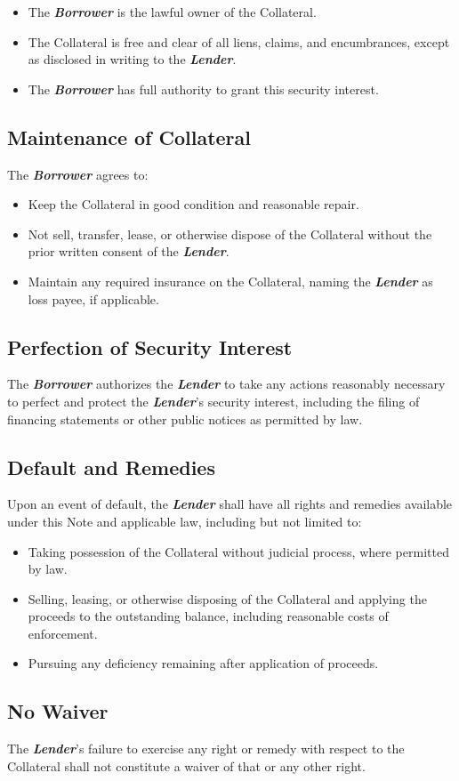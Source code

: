 \begin{itemize}
  \item The \textbf{\textit{Borrower}} is the lawful owner of the Collateral.
  \item The Collateral is free and clear of all liens, claims, and encumbrances, except as disclosed in writing to the \textbf{\textit{Lender}}.
  \item The \textbf{\textit{Borrower}} has full authority to grant this security interest.
\end{itemize}

\subsection*{Maintenance of Collateral}
The \textbf{\textit{Borrower}} agrees to:

\begin{itemize}
  \item Keep the Collateral in good condition and reasonable repair.
  \item Not sell, transfer, lease, or otherwise dispose of the Collateral without the prior written consent of the \textbf{\textit{Lender}}.
  \item Maintain any required insurance on the Collateral, naming the \textbf{\textit{Lender}} as loss payee, if applicable.
\end{itemize}

\subsection*{Perfection of Security Interest}
The \textbf{\textit{Borrower}} authorizes the \textbf{\textit{Lender}} to take any actions reasonably necessary to perfect and protect the \textbf{\textit{Lender}}’s security interest, including the filing of financing statements or other public notices as permitted by law.

\subsection*{Default and Remedies}
Upon an event of default, the \textbf{\textit{Lender}} shall have all rights and remedies available under this Note and applicable law, including but not limited to:

\begin{itemize}
  \item Taking possession of the Collateral without judicial process, where permitted by law.
  \item Selling, leasing, or otherwise disposing of the Collateral and applying the proceeds to the outstanding balance, including reasonable costs of enforcement.
  \item Pursuing any deficiency remaining after application of proceeds.
\end{itemize}

\subsection*{No Waiver}
The \textbf{\textit{Lender}}’s failure to exercise any right or remedy with respect to the Collateral shall not constitute a waiver of that or any other right.

